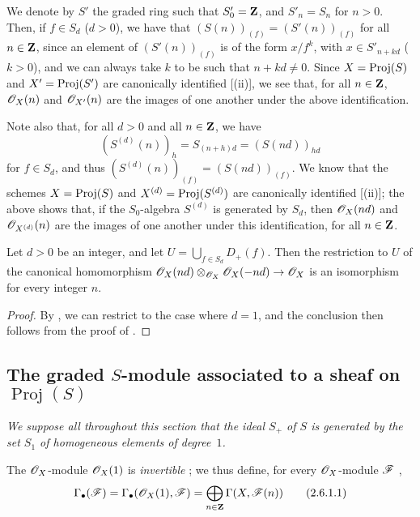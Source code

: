 \begin{env}[2.5.16]
\label{II.2.5.16}
We denote by $S'$ the graded ring such that $S'_0=\mathbf{Z}$, and $S'_n=S_n$ for $n>0$.
Then, if $f\in S_d$ ($d>0$), we have that $(S(n))_{(f)}=(S'(n))_{(f)}$ for all $n\in\mathbf{Z}$, since an element of $(S'(n))_{(f)}$ is of the form $x/f^k$, with $x\in S'_{n+kd}$ ($k>0$), and we can always take $k$ to be such that $n+kd\neq0$.
Since $X=\operatorname{Proj}(S)$ and $X'=\operatorname{Proj}(S')$ are canonically identified [(ii)], we see that, for all $n\in\mathbf{Z}$, $\mathscr{O}_X(n)$ and $\mathscr{O}_{X'}(n)$ are the images of one another under the above identification.

Note also that, for all $d>0$ and all $n\in\mathbf{Z}$, we have
\[
  (S^{(d)}(n))_h = S_{(n+h)d} = (S(nd))_{hd}
\]
for $f\in S_d$, and thus $(S^{(d)}(n))_{(f)}=(S(nd))_{(f)}$.
We know that the schemes $X=\operatorname{Proj}(S)$ and $X^{(d)}=\operatorname{Proj}(S^{(d)})$ are canonically identified [(ii)];
the above shows that, if the $S_0$-algebra $S^{(d)}$ is generated by $S_d$, then $\mathscr{O}_X(nd)$ and $\mathscr{O}_{X^{(d)}}(n)$ are the images of one another under this identification, for all $n\in\mathbf{Z}$.
\end{env}

\begin{proposition}[2.5.17]
\label{II.2.5.17}
Let $d>0$ be an integer, and let $U=\bigcup_{f\in S_d}D_+(f)$.
Then the restriction to $U$ of the canonical homomorphism $\sh{O}_X(nd)\otimes_{\sh{O}_X}\sh{O}_X(-nd)\to\sh{O}_X$ is an isomorphism for every integer $n$.
\end{proposition}

\begin{proof}
By , we can restrict to the case where $d=1$, and the conclusion then follows from the proof of .
\end{proof}


\subsection{The graded $S$-module associated to a sheaf on $\operatorname{Proj}(S)$}
\label{subsection:II.2.6}

\emph{We suppose all throughout this section that the ideal $S_+$ of $S$ is generated by the set $S_1$ of homogeneous elements of degree~$1$.}

\begin{env}[2.6.1]
\label{II.2.6.1}
The $\mathscr{O}_X$-module $\mathscr{O}_X(1)$ is \emph{invertible} ;
we thus define, for every $\mathscr{O}_X$-module $\mathscr{F}$ ,
\[
\label{II.2.6.1.1}
  \Gamma_\bullet(\mathscr{F})
  = \Gamma_\bullet(\mathscr{O}_X(1),\mathscr{F})
  = \bigoplus_{n\in\mathbf{Z}} \Gamma(X,\mathscr{F}(n))
\tag{2.6.1.1}
\]
\end{env}
